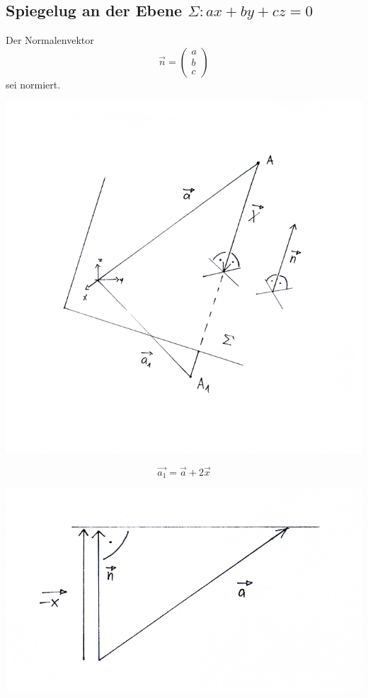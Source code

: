 \documentclass[a4paper,10pt]{report}
\begin{document}
\subsection{Spiegelug an der Ebene $\Sigma: ax + by + cz = 0$}
Der Normalenvektor
\begin{equation*}
\vec{n} = \begin{pmatrix}a\\b\\c\end{pmatrix}
\end{equation*}
sei normiert.
\begin{center}
	 \includegraphics[width=\textwidth]{imgs/spiegelungAnEbene1.png}
 \end{center}
\begin{equation*}
	\vec{a_1} = \vec{a} + 2\vec{x}
\end{equation*}
\begin{center}
	 \includegraphics[width=\textwidth]{imgs/spiegelungAnEbene2.png}
 \end{center}
\end{document}
